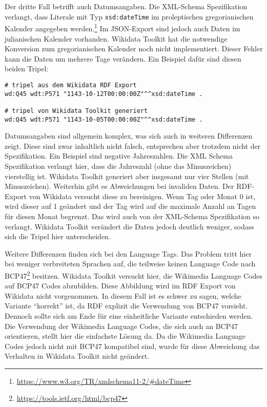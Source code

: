 Der dritte Fall betrifft auch Datumsangaben.
Die XML-Schema Spezifikation verlangt, dass Literale mit Typ \verb|xsd:dateTime| im proleptischen gregorianischen Kalender angegeben werden.\footnote{\url{https://www.w3.org/TR/xmlschema11-2/\#dateTime}}
Im JSON-Export sind jedoch auch Daten im julianischen Kalender vorhanden.
Wikidata Toolkit hat die notwendige Konversion zum gregorianischen Kalender noch nicht implementiert.
Dieser Fehler kann die Daten um mehrere Tage verändern. Ein Beispiel dafür sind diesen beiden Tripel:
\begin{lstlisting}[language=SPARQL]
# tripel aus dem Wikidata RDF Export
wd:Q45 wdt:P571 "1143-10-12T00:00:00Z"^^xsd:dateTime .

# tripel von Wikidata Toolkit generiert
wd:Q45 wdt:P571 "1143-10-05T00:00:00Z"^^xsd:dateTime .
\end{lstlisting}

Datumsangaben sind allgemein komplex, was sich auch in weiteren Differenzen zeigt. 
Diese sind zwar inhaltlich nicht falsch, entsprechen aber trotzdem nicht der Spezifikation.
Ein Beispiel sind negative Jahreszahlen.
Die XML Schema Spezifikation verlangt hier, dass die Jahreszahl (ohne das Minuszeichen) vierstellig ist.
Wikidata Toolkit generiert aber insgesamt nur vier Stellen (mit Minuszeichen).
Weiterhin gibt es Abweichungen bei invaliden Daten.
Der RDF-Export von Wikidata versucht diese zu bereinigen.
Wenn Tag oder Monat 0 ist, wird dieser auf 1 geändert und der Tag wird auf die maximale Anzahl an Tagen für diesen Monat begrenzt.
Das wird auch von der XML-Schema Spezifikation so verlangt.
Wikidata Toolkit verändert die Daten jedoch deutlich weniger, sodass sich die Tripel hier unterscheiden.

Weitere Differenzen finden sich bei den Language Tags.
Das Problem tritt hier bei weniger verbreiteten Sprachen auf, die teilweise keinen Language Code nach BCP47\footnote{\url{https://tools.ietf.org/html/bcp47}} besitzen.
Wikidata Toolkit versucht hier, die Wikimedia Language Codes auf BCP47 Codes abzubilden.
Diese Abbildung wird im RDF Export von Wikidata nicht vorgenommen.
In diesem Fall ist es schwer zu sagen, welche Variante "`korrekt"' ist, da RDF explizit die Verwendung von BCP47 vorsieht.
Dennoch sollte sich am Ende für eine einheitliche Variante entschieden werden.
Die Verwendung der Wikimedia Language Codes, die sich auch an BCP47 orientieren, stellt hier die einfachste Lösung da.
Da die Wikimedia Language Codes jedoch nicht mit BCP47 kompatibel sind, wurde für diese Abweichung das Verhalten in Wikidata Toolkit nicht geändert.

